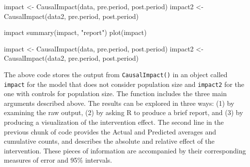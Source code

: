 \documentclass[12pt]{article}
\newenvironment{Shaded}{\begin{snugshade}}{\end{snugshade}}
\newcommand{\FunctionTok}[1]{\textcolor[rgb]{0.00,0.00,0.00}{#1}}
\newcommand{\NormalTok}[1]{#1}
\newcommand{\OtherTok}[1]{\textcolor[rgb]{0.56,0.35,0.01}{#1}}
\newcommand{\StringTok}[1]{\textcolor[rgb]{0.31,0.60,0.02}{#1}}
\begin{document}
\begin{Shaded}
\begin{Highlighting}[numbers=left,,]
\NormalTok{impact }\OtherTok{\textless{}{-}} \FunctionTok{CausalImpact}\NormalTok{(data, pre.period, post.period)}
\NormalTok{impact2 }\OtherTok{\textless{}{-}} \FunctionTok{CausalImpact}\NormalTok{(data2, pre.period, post.period)}

\NormalTok{impact}
\FunctionTok{summary}\NormalTok{(impact, }\StringTok{"report"}\NormalTok{)}
\FunctionTok{plot}\NormalTok{(impact)}
\end{Highlighting}
\end{Shaded}

\begin{Shaded}
\begin{Highlighting}[]
\NormalTok{impact }\OtherTok{\textless{}{-}} \FunctionTok{CausalImpact}\NormalTok{(data, pre.period, post.period)}
\NormalTok{impact2 }\OtherTok{\textless{}{-}} \FunctionTok{CausalImpact}\NormalTok{(data2, pre.period, post.period)}
\end{Highlighting}
\end{Shaded}

The above code stores the output from \texttt{CausalImpact()} in an
object called \texttt{impact} for the model that does not consider
population size and \texttt{impact2} for the one with controls for
population size. The function includes the three main arguments
described above. The results can be explored in three ways: (1) by
examining the raw output, (2) by asking R to produce a brief report, and
(3) by producing a visualization of the intervention effect. The second
line in the previous chunk of code provides the Actual and Predicted
averages and cumulative counts, and describes the absolute and relative
effect of the intervention. These pieces of information are accompanied
by their corresponding measures of error and 95\% intervals.
\end{document}
